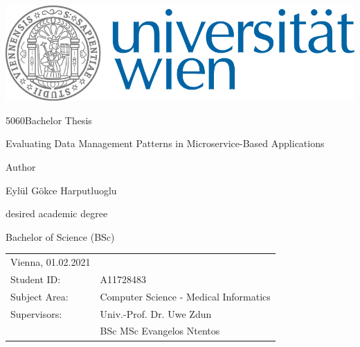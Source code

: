 \documentclass{article}
\makeatletter
\newcommand\HUGE{\@setfontsize\Huge{50}{60}}
\makeatother
\begin{document}
        


\thispagestyle{empty}
\begin{center}
\begin{minipage}{0.9\linewidth}
\flushright
	      		 
    \includegraphics[width=0.5\linewidth]{univie.jpg}\par
    \vspace{1.5cm}
\centering 	

	{\scshape{\HUGE Bachelor Thesis\par}}
	\vspace{1cm}

    {\scshape{\Large Evaluating Data Management Patterns in Microservice-Based Applications \par}}
    \vspace{2cm}
    
  
 Author  \linebreak
 {\Large  Eylül Gökce Harputluoglu \par}
 	\vspace{1.5cm}
desired academic degree \linebreak
 {\Large Bachelor of Science (BSc)\par}
	\vspace{1.5cm}

\flushleft
	

\begin{tabular}{ll}
Vienna, 01.02.2021	\linebreak
\vspace{1cm}&   \\
  Student ID: & A11728483 \vspace{0.3cm} \\ 
  Subject Area: & Computer Science  -  Medical Informatics \vspace{0.3cm} \\
  Supervisors: & Univ.-Prof. Dr. Uwe Zdun \vspace{0.3cm} \\
  & BSc MSc  Evangelos Ntentos \\
 \end{tabular}


    
    
\end{minipage}
\end{center}
\clearpage
\end{document}
